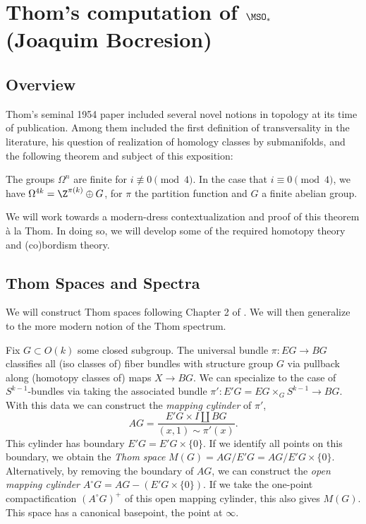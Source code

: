 % 

% 


\section{Thom's computation of $\MSO_\ast$ (Joaquim Bocresion)}
\subsection{Overview}
Thom's seminal 1954 paper included several novel notions in topology at its time of publication. Among them included the first definition of transversality in the literature, his question of realization of homology classes by submanifolds, and the following theorem and subject of this exposition:
\begin{theorem}
The groups $\Omega^n$ are finite for $i\not\equiv 0\pmod 4$. In the case that $i\equiv 0\pmod 4$, we have $\Omega^{4k}=\Z^{\pi(k)}\oplus G$, for $\pi$ the partition function and $G$ a finite abelian group.
\end{theorem}
We will work towards a modern-dress contextualization and proof of this theorem \`a la Thom. In doing so, we will develop some of the required homotopy theory and (co)bordism theory. 



\subsection{Thom Spaces and Spectra}
We will construct Thom spaces following Chapter 2 of \cite{thomQuelquesProprietesGlobales1954}. We will then generalize to the more modern notion of the Thom spectrum. 

Fix $G\subset O(k)$ some closed subgroup. The universal bundle $\pi: EG\to BG$ classifies all (iso classes of) fiber bundles with structure group $G$ via pullback along (homotopy classes of) maps $X\to BG$. We can specialize to the case of $S^{k-1}$-bundles via taking the associated bundle $\pi':E'G=EG\times_G S^{k-1}\to BG$. With this data we can construct the \textit{mapping cylinder} of $\pi'$,
\[
AG=\frac{E'G\times I\coprod BG}{(x,1)\sim \pi'(x)}.
\]
This cylinder has boundary $E'G=E'G\times \{0\}$. If we identify all points on this boundary, we obtain the \textit{Thom space} $M(G)=AG/E'G=AG/E'G\times\{0\}$. Alternatively, by removing the boundary of $AG$, we can construct the \textit{open mapping cylinder} $A^\circ G=AG-(E'G\times\{0\})$. If we take the one-point compactification $(A^\circ G)^+$ of this open mapping cylinder, this also gives $M(G)$. This space has a canonical basepoint, the point at $\infty$. 

